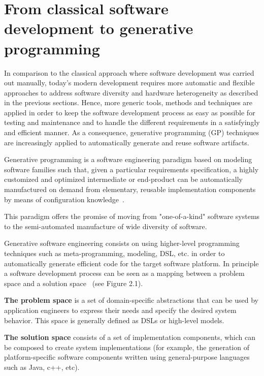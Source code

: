 \section{From classical software development to generative programming}
\label{sec:FROM} 
In comparison to the classical approach where software development was carried out manually, today’s modern development requires more automatic and flexible approaches to address software diversity and hardware heterogeneity as described in the previous sections.
Hence, more generic tools, methods and techniques are applied in order to keep the software development process as easy as possible for testing and maintenance and to handle the different requirements in a satisfyingly and efficient manner.
As a consequence, generative programming (GP) techniques are increasingly applied to automatically generate and reuse software artifacts.
\begin{mydef}
		Generative programming is a software engineering paradigm based on modeling software families such that, given a particular requirements specification, a highly customized and optimized intermediate or end-product can be automatically manufactured on demand from elementary, reusable implementation components by means of configuration knowledge~\cite{Czarnecki:2000:GPM:345203}.
\end{mydef}

This paradigm offers the promise of moving from "one-of-a-kind" software systems to the semi-automated manufacture of wide diversity of software.

Generative software engineering consists on using higher-level programming techniques such as meta-programming, modeling, DSL, etc. in order to automatically generate efficient code for the target software platform. 
In principle a software development process can be seen as a mapping between a problem space and a solution space~\cite{czarnecki2005overview} (see Figure 2.1). 

\textbf{The problem space} is a set of domain-specific abstractions that can be used by application engineers to express their needs and specify the desired system behavior. This space is generally defined  as DSLs or high-level models. 

\textbf{The solution space} consists of a set of implementation components, which can be composed to create system implementations (for example, the generation of platform-specific software components written using general-purpose languages such as Java, c++, etc).

